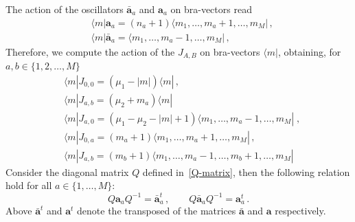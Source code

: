 \documentclass[11pt]{article}
\numberwithin{equation}{section}
\newcommand{\oa}{\mathbf{a}}
\newcommand{\oad}{\mathbf{\bar{a}}}
\newcommand{\M}{M}
\newcommand{\eJ}{J}
\begin{document}
The action of the oscillators $\oad_{a}$ and $\oa_{a}$ on bra-vectors read
\begin{equation}\label{action-oscillator-bra}
\begin{split}
    &\langle m|\oa_{a}=(n_{a}+1)\langle m_{1},\ldots,m_{a}+1,\ldots,m_{\M} |\,,\\
    &\langle m|\oad_{a}=\langle m_{1},\ldots, m_{a}-1,\ldots, m_{\M}|\,,
    \end{split}
\end{equation}
Therefore, we compute the action of the $J_{A,B}$ on bra-vectors $\langle m|$, obtaining, for $a,b\in \{1,2,\ldots,\M\}$
\begin{equation}\label{right-action}
    \begin{split}
        &\langle m|\eJ_{0,0}=\left(\mu_1-|m|\right)\langle m|\,,\\
        &\langle m|\eJ_{a,b}=\left(\mu_2+m_{a}\right)\langle m|\\
        &\langle m|\eJ_{a,0}=(\mu_1-\mu_2-|m|+1)\langle m_{1},\ldots,m_{a}-1,\ldots,m_{\M}|\;,\\
        &\langle m|\eJ_{0,a}=(m_{a}+1)\langle m_{1},\ldots,m_{a}+1,\ldots,m_{\M}|\,,\\
        &\langle m|\eJ_{a,b}=(m_{b}+1)\langle m_{1},\ldots,m_{a}-1,\ldots,m_{b}+1,\ldots,m_{\M}|
    \end{split}
\end{equation}
																																										        Consider the diagonal matrix $Q$ defined in~\eqref{Q-matrix}, then the following relation hold for all $a\in \{1,\ldots,\M\}$:
        	\begin{equation}\label{transpositoin-oscillator}
	Q\oa_{a}Q^{-1}=\oad_{a}^{t}\,,\qquad  Q\oad_{a}Q^{-1}=\oa_{a}^{t}\,.
\end{equation}
Above $\oad^{t}$ and $\oa^{t}$ denote the transposed of the matrices $\oad$ and $\oa$ respectively. 
\end{document}
